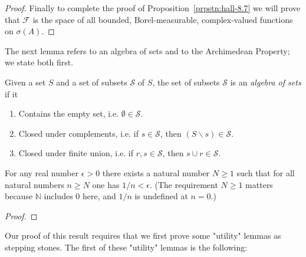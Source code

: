 \begin{proof}
Finally to complete the proof of Proposition~\ref{prpstn:hall-8.7} we will prove that $\mathcal{F}$ is the space of all bounded, Borel-measurable, complex-valued functions on $\sigma(A)$.
\end{proof}

The next lemma refers to an algebra of sets and to the Archimedean Property; we state both first.

\begin{definition}
    \label{def:algebra-of-sets}
    \leanok
    Given a set $S$ and a set of subsets $\mathcal{S}$ of $S$, the set of subsets $\mathcal{S}$ is an \textit{algebra of sets} if it
    \begin{enumerate}
        \item Contains the empty set, i.e. $\emptyset \in \mathcal{S}$.
        \item Closed under complements, i.e. if $s \in \mathcal{S}$, then $(S \backslash s) \in \mathcal{S}$.
        \item Closed under finite union, i.e. if $r,s \in \mathcal{S}$, then $s \cup r \in \mathcal{S}$.
    \end{enumerate}
\end{definition}

\begin{theorem}
    \label{thrm:archimedean-property}
    \leanok
    For any real number $\epsilon > 0$ there exists a natural number $N \ge 1$ such that for all natural numbers $n \ge N$ one has $1/n < \epsilon$. (The requirement $N \ge 1$ matters because $\mathbb{N}$ includes $0$ here, and $1/n$ is undefined at $n = 0$.)
\end{theorem}
\begin{proof}
\leanok
\end{proof}

Our proof of this result requires that we first prove some "utility" lemmas as stepping stones. The first of these "utility" lemmas is the following:

